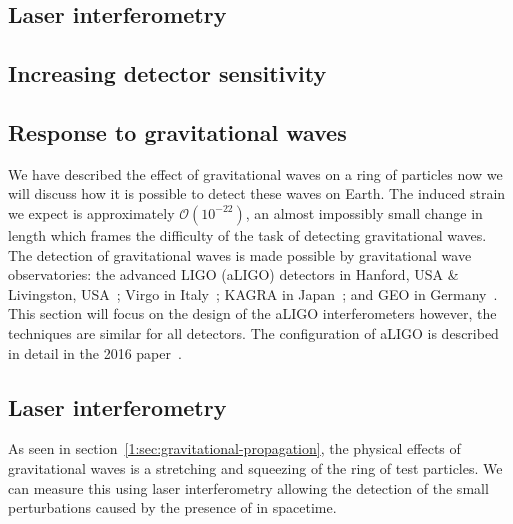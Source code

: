 

\subsection{\label{}Laser interferometry}

\subsection{\label{}Increasing detector sensitivity}

\subsection{\label{}Response to gravitational waves}

We have described the effect of gravitational waves on a ring of particles now we will discuss how it is possible to detect these waves on Earth. The induced strain we expect is approximately $\mathcal{O}(10^{-22})$, an almost impossibly small change in length which frames the difficulty of the task of detecting gravitational waves. The detection of gravitational waves is made possible by gravitational wave observatories: the advanced LIGO (aLIGO) detectors in Hanford, USA \& Livingston, USA~\cite{aLIGO:2015}; Virgo in Italy~\cite{aVirgo:2015}; KAGRA in Japan~\cite{KAGRA:2021}; and GEO in Germany~\cite{GEO600:2002}. This section will focus on
the design of the aLIGO interferometers however, the techniques are similar for all detectors. The configuration of aLIGO is described in detail in the 2016 paper~\cite{aLIGO:2015}.

\subsection{\label{1:sec:laser_interferometry}Laser interferometry}

As seen in section~\ref{1:sec:gravitational-propagation}, the physical effects of gravitational waves is a stretching and squeezing of the ring of test particles. We can measure this using laser interferometry allowing the detection of the small
perturbations caused by the presence of \gws in spacetime.

